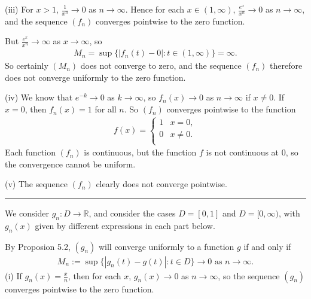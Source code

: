 \documentclass[letterpaper,10pt,english]{jupyterBook}
\begin{document}
\sphinxAtStartPar
(iii) For \(x>1\), \(\frac{1}{x^n} \rightarrow 0\) as \(n\rightarrow \infty\). Hence for each \(x\in (1,\infty )\), \(\frac{e^x}{x^n}\rightarrow 0\) as \(n\rightarrow \infty\), and the sequence \((f_n)\) converges pointwise to the zero function.

But \(\frac{e^x}{x^n}\rightarrow \infty\) as \(x\rightarrow \infty\), so
\begin{equation*}
\begin{split}
M_n = \sup \{ |f_n(t) -0| : t\in (1,\infty ) \} = \infty.
\end{split}
\end{equation*}
\sphinxAtStartPar
So certainly \((M_n)\) does not converge to zero, and the sequence \((f_n)\) therefore does not converge uniformly to the zero function.

\sphinxAtStartPar
(iv) We know that \(e^{-k}\rightarrow 0\) as \(k\rightarrow \infty\), so \(f_n(x)\rightarrow 0\) as \(n\rightarrow \infty\) if \(x\neq 0\). If \(x=0\), then \(f_n(x)=1\) for all \(n\). So \((f_n)\) converges pointwise to the function
\begin{equation*}
\begin{split}
f(x) = \left\{ \begin{array}{ll}
1 & x=0, \\
0 & x\neq 0. \\
\end{array} \right.
\end{split}
\end{equation*}
\sphinxAtStartPar
Each function \((f_n)\) is continuous, but the function \(f\) is not continuous at \(0\), so the convergence cannot be uniform.

\sphinxAtStartPar
(v) The sequence \((f_n)\) clearly does not converge pointwise.


\bigskip\hrule\bigskip


\sphinxAtStartPar
{\hyperref[\detokenize{Problems:id56}]{}} We consider \(g_n:D\to\mathbb{R}\), and consider the cases \(D=[0,1]\) and \(D=[0,\infty)\), with \(g_n(x)\) given by different expressions in each part below.

By Proposion 5.2, \((g_n)\) will converge uniformly to a function \(g\) if and only if
\begin{equation*}
\begin{split}
M_n := \sup \{ |g_n(t) -g(t)| : t\in D \} \rightarrow 0 \text{ as } n\rightarrow \infty.
\end{split}
\end{equation*}
\sphinxAtStartPar
(i) If \(\displaystyle g_n(x)=\frac{x}{n}\), then for each \(x\), \(g_n(x)\rightarrow 0\) as \(n\rightarrow \infty\), so the sequence \((g_n)\) converges pointwise to the zero function.
\end{document}
